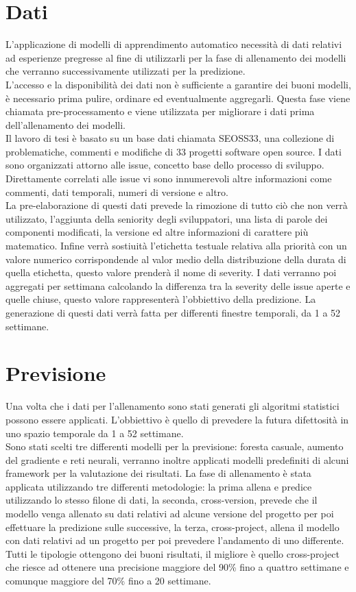 \documentclass{article}
\begin{document}
\section{Dati}
L'applicazione di modelli di apprendimento automatico necessità di dati relativi ad esperienze pregresse al fine di utilizzarli per la fase di allenamento dei modelli che verranno successivamente utilizzati per la predizione.\\
L'accesso e la disponibilità dei dati non è sufficiente a garantire dei buoni modelli, è necessario prima pulire, ordinare ed eventualmente aggregarli. Questa fase viene chiamata pre-processamento e viene utilizzata per migliorare i dati prima dell'allenamento dei modelli.\\
Il lavoro di tesi è basato su un base dati chiamata SEOSS33, una collezione di problematiche, commenti e modifiche di 33 progetti software open source. I dati sono organizzati attorno alle issue, concetto base dello processo di sviluppo. Direttamente correlati alle issue vi sono innumerevoli altre informazioni come commenti, dati temporali, numeri di versione e altro.\\
La pre-elaborazione di questi dati prevede la rimozione di tutto ciò che non verrà utilizzato, l'aggiunta della seniority degli sviluppatori, una lista di parole dei componenti modificati, la versione ed altre informazioni di carattere più matematico. Infine verrà sostiuità l'etichetta testuale relativa alla priorità con un valore numerico corrispondende al valor medio della distribuzione della durata di quella etichetta, questo valore prenderà il nome di severity. I dati verranno poi aggregati per settimana calcolando la differenza tra la severity delle issue aperte e quelle chiuse, questo valore rappresenterà l'obbiettivo della predizione. La generazione di questi dati verrà fatta per differenti finestre temporali, da 1 a 52 settimane.

\section{Previsione}
Una volta che i dati per l'allenamento sono stati generati gli algoritmi statistici possono essere applicati. L'obbiettivo è quello di prevedere la futura difettosità in uno spazio temporale da 1 a 52 settimane.\\
Sono stati scelti tre differenti modelli per la previsione: foresta casuale, aumento del gradiente e reti neurali, verranno inoltre applicati modelli predefiniti di alcuni framework per la valutazione dei risultati. La fase di allenamento è stata applicata utilizzando tre differenti metodologie: la prima allena e predice utilizzando lo stesso filone di dati, la seconda, cross-version, prevede che il modello venga allenato su dati relativi ad alcune versione del progetto per poi effettuare la predizione sulle successive, la terza, cross-project, allena il modello con dati relativi ad un progetto per poi prevedere l'andamento di uno differente.\\
Tutti le tipologie ottengono dei buoni risultati, il migliore è quello cross-project che riesce ad ottenere una precisione maggiore del 90\% fino a quattro settimane e comunque maggiore del 70\% fino a 20 settimane. 
\end{document}
